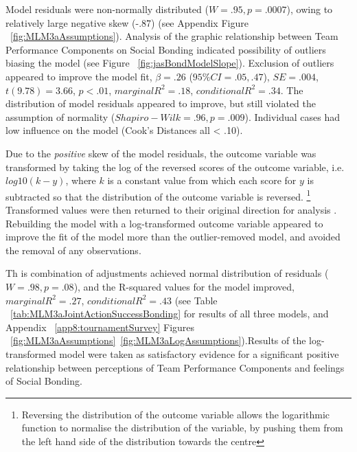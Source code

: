 \begin{CJK}{UTF8}{gbsn}
Model residuals were non-normally distributed ($W = .95, p = .0007$), owing to relatively large negative skew (-.87) (see Appendix Figure ~\ref{fig:MLM3aAssumptions}).  Analysis of the graphic relationship between Team Performance Components on Social Bonding indicated possibility of outliers biasing the model (see Figure ~\ref{fig:jasBondModelSlope}).  Exclusion of outliers appeared to improve the model fit, $\beta = .26$ ($95\% CI =  .05, .47$), $SE = .004$, $t(9.78) = 3.66$, $p < .01$, $marginal R^2 = .18$, $conditional R^2 = .34$.  The distribution of model residuals appeared to improve, but still violated the assumption of normality ($Shapiro-Wilk = .96, p = .009$).  Individual cases had low influence on the model (Cook's Distances all < .10).

Due to the \textit{positive} skew of the model residuals, the outcome variable was transformed by taking the log of the reversed scores of the outcome variable, i.e. $log10(k - y)$, where $k$ is a constant value from which each score for $y$ is subtracted so that the distribution of the outcome variable is reversed\citep{Howell2012}.
  \footnote{Reversing the distribution of the outcome variable allows the logarithmic function to normalise the distribution of the variable, by pushing them from the left hand side of the distribution towards the centre}
Transformed values were then returned to their original direction for analysis \citep{Field2012}.  Rebuilding the model with a log-transformed outcome variable appeared to improve the fit of the model more than the outlier-removed model, and avoided the removal of any observations.

Th is combination of adjustments achieved normal distribution of residuals ($W = .98, p = .08$), and the R-squared values for the model improved, $marginal R^2 = .27$, $conditional R^2 = .43$ (see Table ~\ref{tab:MLM3aJointActionSuccessBonding} for results of all three models, and Appendix ~\ref{app8:tournamentSurvey} Figures ~\ref{fig:MLM3aAssumptions}\nobreakdash~\ref{fig:MLM3aLogAssumptions}).Results of the log-transformed model were taken as satisfactory evidence for a significant positive relationship between perceptions of Team Performance Components and feelings of Social Bonding.


\end{CJK}
